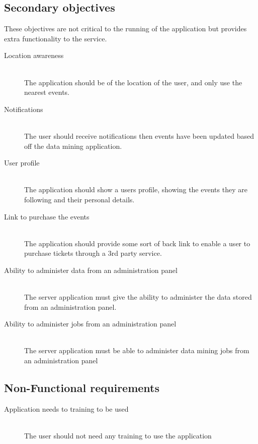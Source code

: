 	\subsection{Secondary objectives}
		These objectives are not critical to the running of the application but provides extra functionality to the service. 

		\begin{description}
			\item[Location awareness] \hfill \\
				The application should be  of the location of the user, and only use the nearest events. 
			\item[Notifications] \hfill \\
				The user should receive notifications then events have been updated based off the data mining application.
			\item [User profile] \hfill \\
				The application should show a users profile, showing the events they are following and their personal details.
			\item[Link to purchase the events] \hfill \\
				The application should provide some sort of back link to enable a user to purchase tickets through a 3rd party service. 
			\item[Ability to administer data from an administration panel] \hfill \\
				The server application must give the ability to administer the data stored from an administration panel.
			\item[Ability to administer jobs from an administration panel] \hfill \\
				The server application must be able to administer data mining jobs from an administration panel
		\end{description}

	\subsection{Non-Functional requirements}
		\begin{description}
			\item[Application needs to training to be used] \hfill \\
				The user should not need any training to use the application
				
		\end{description}

